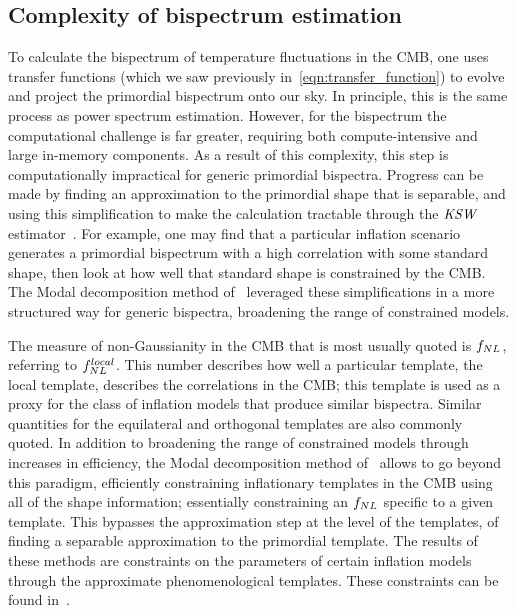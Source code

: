     \subsection{Complexity of bispectrum estimation}\label{sec:bis_est}
To calculate the bispectrum of temperature fluctuations in the CMB, 
one uses transfer functions
(which we saw previously in~\eqref{eqn:transfer_function})
to evolve and project the primordial bispectrum onto our sky.
In principle, this is the same process as power spectrum estimation.
However, for the bispectrum the computational challenge is far greater,
requiring both compute-intensive and large in-memory components.
As a result of this complexity, this step is computationally impractical for generic primordial bispectra.
Progress can be made by finding an approximation to the primordial shape
that is separable, and using this simplification
to make the calculation tractable
through the ${\textit{\text{KSW}}}$ estimator~\cite{Komatsu_2005, Munchmeyer_2014, Smith_2011}.
For example, one may find that a particular inflation scenario generates
a primordial bispectrum with a high correlation with some standard shape,
then look at how well that standard shape is constrained by the CMB.
The Modal decomposition method of~\cite{FergShell_1,FergShell_2,FergShell_3}
leveraged these simplifications in a more structured way
for generic bispectra, broadening the range of constrained models.


The measure of non-Gaussianity in the CMB that is
most usually quoted is $f_{NL}$, referring to $f^{local}_{NL}$.
This number describes how well a particular template, the local template,
describes the correlations in the CMB;
this template is used as a proxy for the class of inflation models that produce similar bispectra.
Similar quantities for the equilateral and orthogonal templates are also
commonly quoted.
In addition to broadening the range of constrained models through increases in efficiency,
the Modal decomposition method of~\cite{FergShell_1,FergShell_2,FergShell_3}
allows to go beyond this paradigm, efficiently constraining inflationary templates in the CMB using
all of the shape information; essentially constraining an $f_{NL}$
specific to a given template. This bypasses the approximation step at the level of the templates,
of finding a separable approximation to the primordial template.
The results of these methods are constraints on the parameters of
certain inflation models through the approximate phenomenological templates.
These constraints can be found in~\cite{Planck_NG_2015, Planck_NG_2018}.


